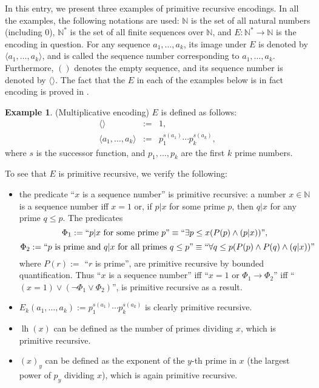 \documentclass[12pt]{article}
\begin{document}
In this entry, we present three examples of primitive recursive encodings.  In all the examples, the following notations are used: $\mathbb{N}$ is the set of all natural numbers (including $0$), $\mathbb{N}^*$ is the set of all finite sequences over $\mathbb{N}$, and $E:\mathbb{N}^* \to \mathbb{N}$ is the encoding in question.  For any sequence $a_1, \ldots, a_k$, its image under $E$ is denoted by $\langle a_1, \ldots, a_k \rangle$, and is called the sequence number corresponding to $a_1, \ldots, a_k$.  Furthermore, $()$ denotes the empty sequence, and its sequence number is denoted by $\langle \rangle$.  The fact that the $E$ in each of the examples below is in fact encoding is proved in .

\textbf{Example 1}.  (Multiplicative encoding)  $E$ is defined as follows: 
\begin{eqnarray*}
\langle \rangle &:=& 1, \\
\langle a_1 , \ldots, a_k \rangle &:=&  p_1 ^ {s(a_1)} \cdots p_k ^ {s(a_k)},
\end{eqnarray*}
where $s$ is the successor function, and $p_1, \ldots, p_k$ are the first $k$ prime numbers.

To see that $E$ is primitive recursive, we verify the following:
\begin{itemize}
\item the predicate ``$x$ is a sequence number'' is primitive recursive: a number $x\in \mathbb{N}$ is a sequence number iff $x=1$ or, if $p|x$ for some prime $p$, then $q|x$ for any prime $q\le p$.  The predicates 
$$\Phi_1:= ``p|x\mbox{ for some prime }p \mbox{''} \equiv ``\exists p\le x (P(p) \wedge (p|x))\mbox{''},$$
$$\Phi_2:= ``p\mbox{ is prime and }q|x\mbox{ for all primes }q\le p\mbox{''} \equiv ``\forall q\le p (P(p)\wedge P(q) \wedge (q|x))\mbox{''}$$
where $P(r):=$ ``$r$ is prime'', are primitive recursive by bounded quantification.  Thus ``$x$ is a sequence number'' iff ``$x=1$ or $\Phi_1 \rightarrow \Phi_2$'' iff ``$(x=1) \vee (\neg \Phi_1 \vee \Phi_2)$'', is primitive recursive as a result.
\item $E_k(a_1,\ldots,a_k):= p_1 ^ {s(a_1)} \cdots p_k ^ {s(a_k)}$ is clearly primitive recursive.
\item $\operatorname{lh}(x)$ can be defined as the number of primes dividing $x$, which is primitive recursive.
\item $(x)_y$ can be defined as the exponent of the $y$-th prime in $x$ (the largest power of $p_y$ dividing $x$), which is again primitive recursive.
\end{itemize}
\end{document}
